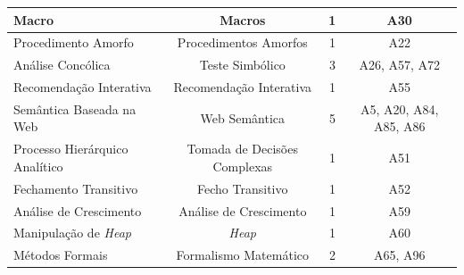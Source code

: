 \begin{table}[h]
{\begin{tabular}{@{}lccc@{}}
			Macro                          & Macros                                                      & 1          & A30                                                                                                   \\\hline
			Procedimento Amorfo            & Procedimentos Amorfos                                       & 1          & A22                                                                                                   \\\hline
			Análise Concólica              & Teste Simbólico                                          & 3          & A26, A57, A72                                                                                         \\\hline
			Recomendação Interativa        & Recomendação Interativa                                     & 1          & A55                                                                                                   \\\hline
			Semântica Baseada na Web       &   Web Semântica                                                          & 5          & A5, A20, A84, A85, A86                                                                                \\\hline
			Processo Hierárquico Analítico &   Tomada de Decisões Complexas                                                          & 1          & A51                                                                                                   \\\hline
			Fechamento Transitivo          &   Fecho Transitivo                                                          & 1          & A52                                                                                                   \\\hline
			Análise de Crescimento         &   Análise de Crescimento                                                          & 1          & A59                                                                                                   \\\hline
			Manipulação de \textit{Heap}            &    \textit{Heap}                                                         & 1          & A60                                                                                                   \\\hline
			Métodos Formais                &   Formalismo Matemático                                                          & 2          & A65, A96                                                                                              \\\hline

\end{tabular}}
\end{table}
